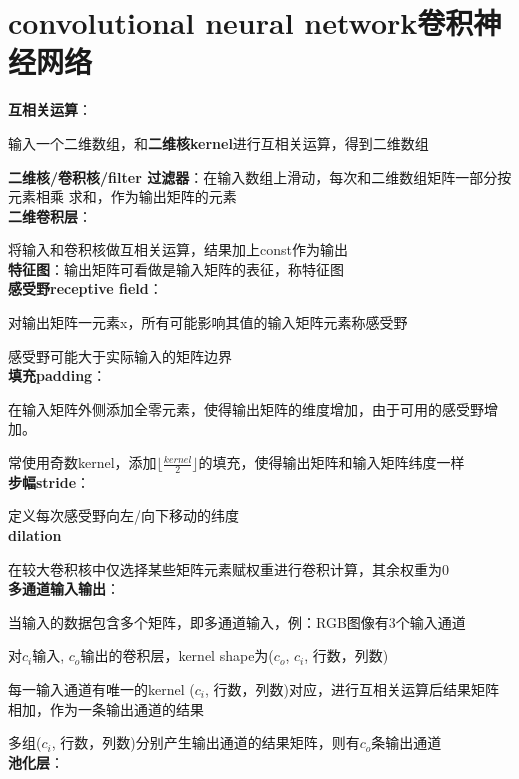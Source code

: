 \documentclass[UTF8]{ctexart}
\begin{document}

\section{convolutional neural network卷积神经网络}
\noindent \textbf{互相关运算}：

  输入一个二维数组，和\textbf{二维核kernel}进行互相关运算，得到二维数组

  \textbf{二维核/卷积核/filter 过滤器}：在输入数组上滑动，每次和二维数组矩阵一部分按元素相乘 求和，作为输出矩阵的元素\\
\textbf{二维卷积层}：

  将输入和卷积核做互相关运算，结果加上const作为输出\\
\textbf{特征图}：输出矩阵可看做是输入矩阵的表征，称特征图\\
\textbf{感受野receptive field}：
  
  对输出矩阵一元素x，所有可能影响其值的输入矩阵元素称感受野

  感受野可能大于实际输入的矩阵边界\\
\textbf{填充padding}：
  
  在输入矩阵外侧添加全零元素，使得输出矩阵的维度增加，由于可用的感受野增加。

  常使用奇数kernel，添加$\lfloor \frac{kernel}{2}\rfloor $的填充，使得输出矩阵和输入矩阵纬度一样\\
\textbf{步幅stride}：

  定义每次感受野向左/向下移动的纬度\\
\textbf{dilation}

  在较大卷积核中仅选择某些矩阵元素赋权重进行卷积计算，其余权重为0\\
\textbf{多通道输入输出}：

  当输入的数据包含多个矩阵，即多通道输入，例：RGB图像有3个输入通道

  对$c_i$输入, $c_o$输出的卷积层，kernel shape为($c_o$, $c_i$, 行数，列数)

  \quad 每一输入通道有唯一的kernel ($c_i$, 行数，列数)对应，进行互相关运算后结果矩阵相加，作为一条输出通道的结果

  \quad 多组($c_i$, 行数，列数)分别产生输出通道的结果矩阵，则有$c_o$条输出通道\\
\textbf{池化层}：
  
\end{document}
